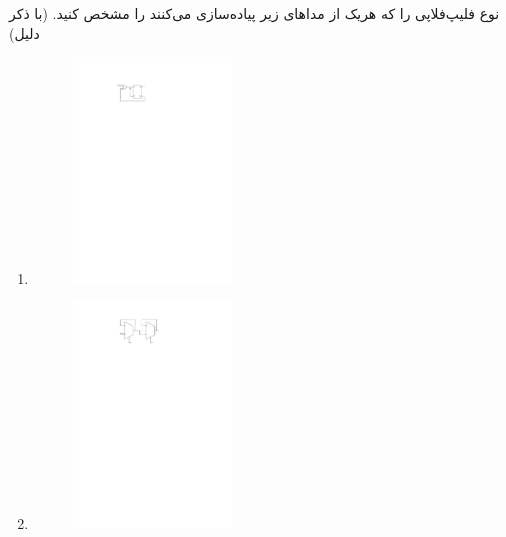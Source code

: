 

نوع فلیپ‌فلاپی را که هریک از مدا‌های زیر پیاده‌سازی می‌کنند را مشخص کنید. (با ذکر دلیل)

\begin{enumerate}
	\item 
	\begin{figure}[h]
		\centering
		\includegraphics[width=0.4\textwidth]{fig/Q_basic3.pdf}
		\label{fig:Q_basic_3_a}
	\end{figure}
	
	
	
	\item 
	\begin{figure}[h]
		\centering
		\includegraphics[width=0.4\textwidth]{fig/Q_basic3_b.pdf}
		\label{fig:Q_basic_3_b}
	\end{figure}
\end{enumerate}